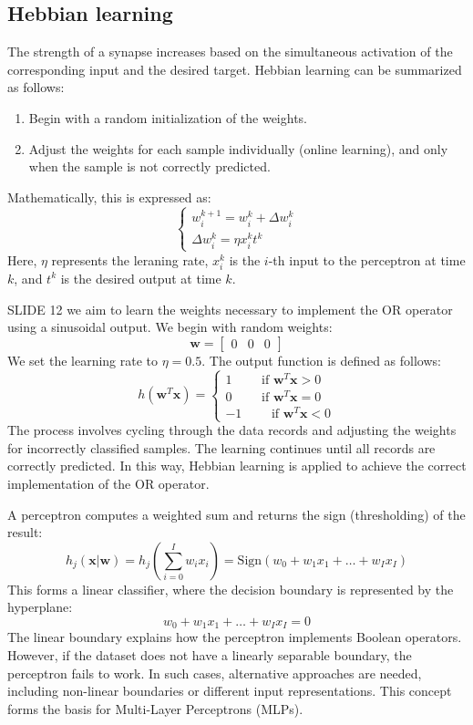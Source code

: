 \subsection{Hebbian learning}
The strength of a synapse increases based on the simultaneous activation of the corresponding input and the desired target. 
Hebbian learning can be summarized as follows:
\begin{enumerate}
    \item Begin with a random initialization of the weights.
    \item Adjust the weights for each sample individually (online learning), and only when the sample is not correctly predicted.
\end{enumerate}
Mathematically, this is expressed as:
\[\begin{cases}
    w_i^{k+1}=w_i^k+\Delta w_i^k \\
    \Delta w_i^k=\eta x_i^kt^k
\end{cases}\]
Here, $\eta$ represents the leraning rate, $x_i^k$ is the $i$-th input to  the perceptron at time $k$, and $t^k$ is the desired output at time $k$.

\begin{example}
    SLIDE 12
    we aim to learn the weights necessary to implement the OR operator using a sinusoidal output. 
    We begin with random weights:
    \[\mathbf{w}=\begin{bmatrix} 0 & 0 & 0 \end{bmatrix}\]
    We set the learning rate to $\eta=0.5$. 
    The output function is defined as follows:
    \[h(\mathbf{w}^T\mathbf{x})=\begin{cases}
        1 \qquad\text{ if }\mathbf{w}^T\mathbf{x} > 0 \\
        0 \qquad\text{ if }\mathbf{w}^T\mathbf{x} = 0 \\
        -1 \qquad\text{ if }\mathbf{w}^T\mathbf{x} < 0
    \end{cases}\]
    The process involves cycling through the data records and adjusting the weights for incorrectly classified samples. 
    The learning continues until all records are correctly predicted. 
    In this way, Hebbian learning is applied to achieve the correct implementation of the OR operator.
\end{example}
A perceptron computes a weighted sum and returns the sign (thresholding) of the result:
\[h_j(\mathbf{x}|\mathbf{w})=h_j\left(\sum_{i=0}^Iw_ix_i\right)=\text{Sign}(w_0+w_1x_1+\dots+w_Ix_I)\]
This forms a linear classifier, where the decision boundary is represented by the hyperplane:
\[w_0+w_1x_1+\dots+w_Ix_I=0\]
The linear boundary explains how the perceptron implements Boolean operators. 
However, if the dataset does not have a linearly separable boundary, the perceptron fails to work. 
In such cases, alternative approaches are needed, including non-linear boundaries or different input representations. 
This concept forms the basis for Multi-Layer Perceptrons (MLPs).